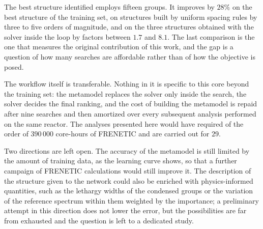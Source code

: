 The best structure identified employs fifteen groups. It improves by $28\%$ on
the best structure of the training set, on structures built by uniform spacing rules by three to five orders
of magnitude, and on the three structures obtained with the solver inside the
loop by factors between $1.7$ and $8.1$. The last comparison is the one that
measures the original contribution of this work, and the gap is a question of how many searches
are affordable rather than of how the objective is posed.

The workflow itself is transferable. Nothing in it is specific to this core
beyond the training set: the metamodel replaces the solver only inside the
search, the solver decides the final ranking, and the cost of building the metamodel
is repaid after nine searches and then amortized over every subsequent analysis
performed on the same reactor. The analyses presented here would have required
of the order of $390\,000$ core-hours of FRENETIC and are carried
out for $29$.

Two directions are left open. The accuracy of the metamodel is still limited by
the amount of training data, as the learning curve shows, so that a further
campaign of FRENETIC calculations would still improve it. The description of the structure
given to the network could also be enriched with physics-informed quantities,
such as the lethargy widths of the condensed groups or the variation of the
reference spectrum within them weighted by the importance; a preliminary attempt
in this direction does not lower the error, but the possibilities are far from
exhausted and the question is left to a dedicated study.
